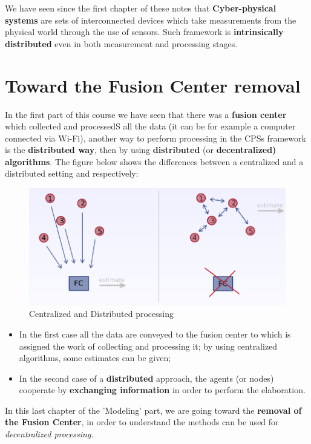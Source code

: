 We have seen since the first chapter of these notes that \textbf{Cyber-physical systems} are sets of interconnected devices which
take measurements from the physical world through the use of sensors. Such framework is \textbf{intrinsically distributed} even in both measurement  and processing stages.
\section{Toward the Fusion Center removal}


\noindent
In the first part of this course we have seen that there was a 
\textbf{fusion center} which collected and processedS all the data (it can be for example a computer connected via Wi-Fi), another way to perform processing in the CPSs framework is the \textbf{distributed way}, then by using \textbf{distributed} (or \textbf{decentralized) algorithms}. The figure below shows the differences between a centralized and a distributed setting and respectively:

\begin{figure}[h]
    \centering
    \includegraphics[scale=0.6]{images/Dist_Centr.png}
    \caption{Centralized and Distributed processing}
\end{figure}
\begin{itemize}
    \item In the first case all the data are conveyed to the fusion center to which is assigned the work of collecting and processing it; by using centralized algorithms, some estimates can be given;
    \item In the second case of a \textbf{distributed} approach, the agents (or nodes)  cooperate by \textbf{exchanging information} in order to perform the elaboration.
\end{itemize}
In this last chapter of the 'Modeling' part, we are going toward the \textbf{removal of the Fusion Center}, in order to understand the methods can be used for \textit{decentralized processing}.

